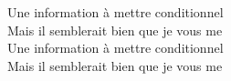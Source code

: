 \songwordfb{} Une information à mettre  conditionnel \\
\songwordfb{} Mais il semblerait bien que je vous me \\
\songwordfb{} Une information à mettre  conditionnel \\
\songwordfb{} Mais il semblerait bien que je vous me \\
